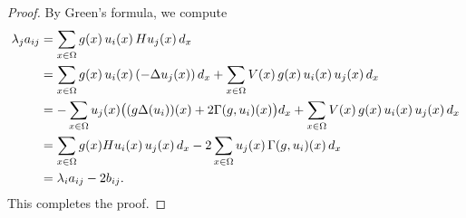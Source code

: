 \documentclass[11pt]{article}
\theoremstyle{definition}
\theoremstyle{remark}
\numberwithin{equation}{section}
\begin{document}
\begin{proof}
By Green's formula, we compute
\begin{align*}
\lambda_j a_{ij}
&= \sum_{x \in \Omega} g(x)\, u_i(x)\, H u_j(x)\, d_x \notag \\
&= \sum_{x \in \Omega} g(x)\, u_i(x)\, (-\Delta u_j(x))\, d_x
   + \sum_{x \in \Omega} V(x)\, g(x)\, u_i(x)\, u_j(x)\, d_x \notag \\
&= - \sum_{x \in \Omega} u_j(x)
   \bigl( (g\Delta ( u_i))(x) + 2 \Gamma(g,u_i)(x) \bigr) d_x
   + \sum_{x \in \Omega} V(x)\, g(x)\, u_i(x)\, u_j(x)\, d_x \notag \\
&= \sum_{x \in \Omega}g(x) H u_i(x)\, u_j(x)\, d_x
   - 2 \sum_{x \in \Omega} u_j(x)\, \Gamma(g,u_i)(x)\, d_x \notag \\
&= \lambda_i a_{ij} - 2 b_{ij}.
\end{align*}
This completes the proof.
\end{proof}
\end{document}
